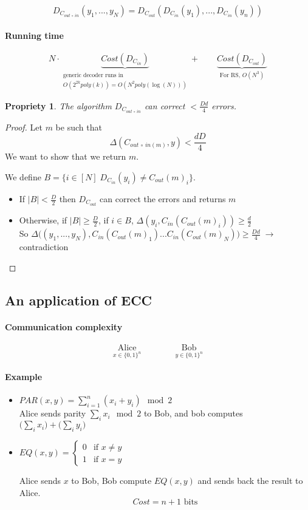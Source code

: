 \documentclass{article}
\newtheorem{prop}{Propriety}
\begin{document}
\[D_{C_{out\,\circ\, in}}(y_1,...,y_N)=D_{C_{out}}(D_{C_{in}}(y_1),...,D_{C_{in}}(y_n))\]


\paragraph{Running time}
\[N\cdot \underbrace{Cost(D_{C_{in}})}_{\substack{\text{generic decoder runs in}\\ O(2^{2k}poly(k))=O(N^2poly(\log(N)))}} + \qquad \underbrace{Cost(D_{C_{out}})}_{\text{For RS, } O(N^3)} \]

\begin{prop}
The algorithm $D_{C_{out \,\circ\, in}}$ can correct $<\frac{Dd}{4}$ errors.
\end{prop}
\begin{proof}
Let $m$ be such that 
\[\Delta( C_{out \,\circ \, in (m)},y) < \frac{dD}{4}\]
We want to show that we return $m$.

We define $B=\{i\in [N] \; D_{C_{in}}(y_i) \neq C_{out}(m)_i\}$.

\begin{itemize}
\item If $|B|<\frac{D}{2}$ then $D_{C_{out}}$ can correct the errors and returns $m$
\item Otherwise, if $|B|\geq \frac{D}{2}$, if $i\in B$, $\Delta(y_i,C_{in}(C_{out}(m)_i))\geq \frac{d}{2}$\\
So $\Delta \Big( (y_1,...,y_N),C_{in}(C_{out}(m)_1)...C_{in}(C_{out}(m)_N) \Big) \geq \frac{Dd}{4} \; \to \; $ contradiction
\end{itemize}
\end{proof}


\subsection{An application of ECC}

\paragraph{Communication complexity}
\[\underset{x\in \{0,1\}^n}{\text{Alice}} \qquad \qquad \underset{y\in \{0,1\}^n}{\text{Bob}} \]

\paragraph{Example}
\begin{itemize}
\item $PAR(x,y)=\sum_{i=1}^n (x_i+y_i) \mod 2$\\
Alice sends parity $\sum_i x_i \mod 2$ to Bob, and bob computes $\Big( \sum_i x_i \Big) + \Big( \sum_i y_i \Big)$
\item $EQ(x,y)=
\begin{cases}
0 & \text{if } x\neq y\\
1 & \text{if } x= y
\end{cases}$

Alice sends $x$ to Bob, Bob compute $EQ(x,y)$ and sends back the result to Alice.
\[Cost = n+1 \text{ bits}\]
\end{itemize}
\end{document}
